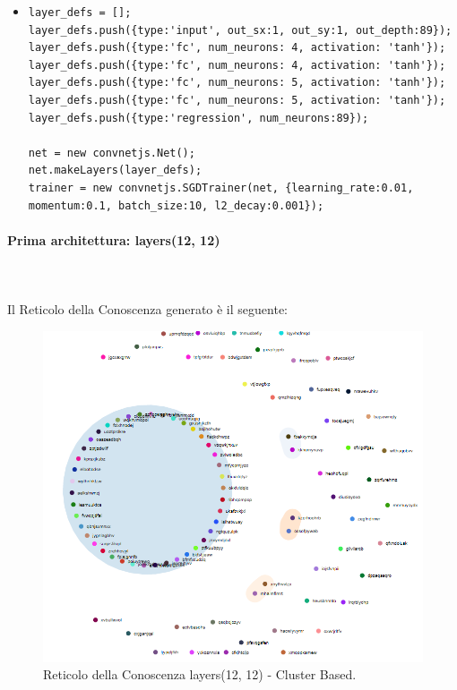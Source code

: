 \begin{itemize}
\item \begin{verbatim}
layer_defs = [];
layer_defs.push({type:'input', out_sx:1, out_sy:1, out_depth:89});
layer_defs.push({type:'fc', num_neurons: 4, activation: 'tanh'});
layer_defs.push({type:'fc', num_neurons: 4, activation: 'tanh'});
layer_defs.push({type:'fc', num_neurons: 5, activation: 'tanh'});
layer_defs.push({type:'fc', num_neurons: 5, activation: 'tanh'});
layer_defs.push({type:'regression', num_neurons:89});
        
net = new convnetjs.Net();
net.makeLayers(layer_defs);
trainer = new convnetjs.SGDTrainer(net, {learning_rate:0.01, 
momentum:0.1, batch_size:10, l2_decay:0.001});
\end{verbatim}
\end{itemize}

\paragraph{Prima architettura: layers(12, 12)}\mbox{}\\\\
\label{Prima architettura}
\noindent
Il Reticolo della Conoscenza generato è il seguente:
\begin{figure}[H]
\centering
	\includegraphics[width=0.70\linewidth]{./image/logica(12,12).png}
	\caption{Reticolo della Conoscenza layers(12, 12) - Cluster Based.}
	\label{Reticolo della Conoscenza layers(12, 12) - Cluster Based.}
\end{figure}
\noindent

